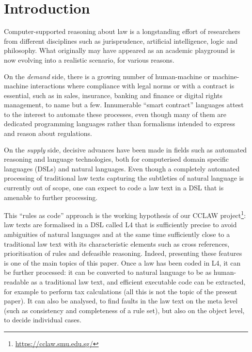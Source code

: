 \section{Introduction}\label{sec:introduction}

Computer-supported reasoning about law is a longstanding effort of researchers
from different disciplines such as jurisprudence, artificial intelligence, logic and
philosophy. What originally may have appeared as an academic playground is
now evolving into a realistic scenario, for various reasons. 

On the \emph{demand} side, there is a growing number of human-machine or
machine-machine interactions where compliance with legal norms or with a contract is essential,
such as in sales, insurance, banking and finance or digital rights management, to name but
a few. Innumerable ``smart contract'' languages attest to the interest to
automate these processes, even though many of them are dedicated
programming languages rather than formalisms intended to express and reason about
regulations.

On the \emph{supply} side, decisive advances have been made in fields such as
automated reasoning and language technologies, both for computerised domain
specific languages (DSLs) and natural languages. Even though a completely
automated processing of traditional law texts capturing the subtleties of
natural language is currently out of scope, one can expect to code a law text
in a DSL that is amenable to further processing.

This ``rules as code'' approach is the working hypothesis of our CCLAW
project\footnote{\url{https://cclaw.smu.edu.sg/}}: law texts are formalised in
a DSL called L4 that is sufficiently precise to avoid ambiguities of natural
languages and at the same time sufficiently close to a traditional law text
with its characteristic elements such as cross references, prioritisation of
rules and defeasible reasoning. Indeed, presenting these features is one of
the main topics of this paper. Once a law has been coded in L4, it can
be further processed: it can be converted to natural language \cite{listemnmaa2021cnl} to
be as human-readable as a traditional law text, and efficient executable code can be
extracted, for example to perform tax calculations (all this is not the topic
of the present paper). It can also be analysed, to find faults in the law
text on the meta level (such as consistency and completeness of a rule set),
but also on the object level, to decide individual cases.


